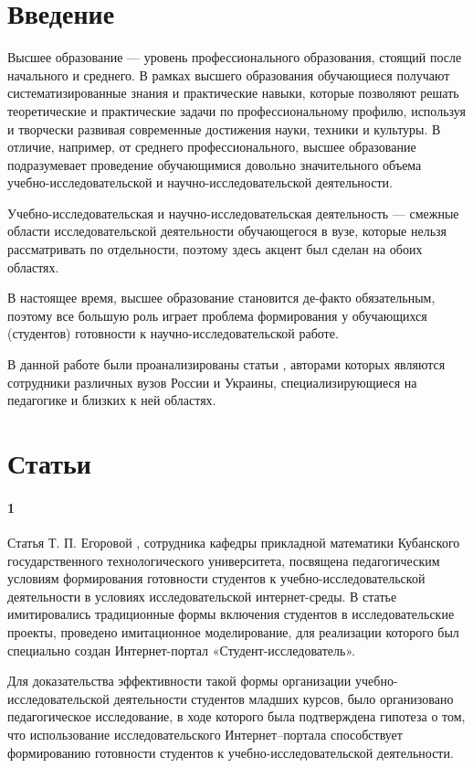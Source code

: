 \documentclass[oneside]{scrartcl}
\begin{document}
\sloppy	
	
\section*{Введение}
Высшее образование --- уровень профессионального образования, стоящий после начального и среднего. В рамках высшего образования
обучающиеся получают систематизированные знания и практические навыки, которые позволяют решать теоретические и практические задачи
по профессиональному профилю, используя и творчески развивая современные достижения науки, техники и культуры. В отличие, например, от среднего профессионального, высшее образование подразумевает проведение обучающимися довольно значительного объема 
учебно-исследовательской и научно-исследовательской деятельности.

Учебно-исследовательская и научно-исследовательская деятельность --- смежные области исследовательской деятельности обучающегося в вузе, которые нельзя рассматривать
по отдельности, поэтому здесь акцент был сделан на обоих областях.
 
В настоящее время, высшее образование становится де-факто обязательным, поэтому все большую роль играет проблема формирования
у обучающихся (студентов) готовности к научно-исследовательской работе.

В данной работе были проанализированы статьи \cite{egorova, bystrenina, prohorova, kalganova, koldina, dolganov}, авторами которых
являются сотрудники различных вузов России и Украины, специализирующиеся на педагогике и близких к ней областях.

\section*{Статьи}
\paragraph{1}
Статья Т. П. Егоровой \cite{egorova}, сотрудника кафедры прикладной математики Кубанского государственного технологического
университета, посвящена педагогическим условиям формирования готовности студентов к учебно-исследовательской деятельности
в условиях исследовательской интернет-среды. В статье имитировались традиционные формы включения студентов в исследовательские
проекты, проведено имитационное моделирование, для реализации которого был специально создан Интернет-портал 
«Студент-исследователь».

Для доказательства эффективности такой формы организации учебно-исследовательской деятельности студентов младших курсов, было
организовано педагогическое исследование, в ходе которого была подтверждена гипотеза о том, что использование исследовательского
Интернет–портала способствует формированию готовности студентов к учебно-исследовательской деятельности.
\end{document}
